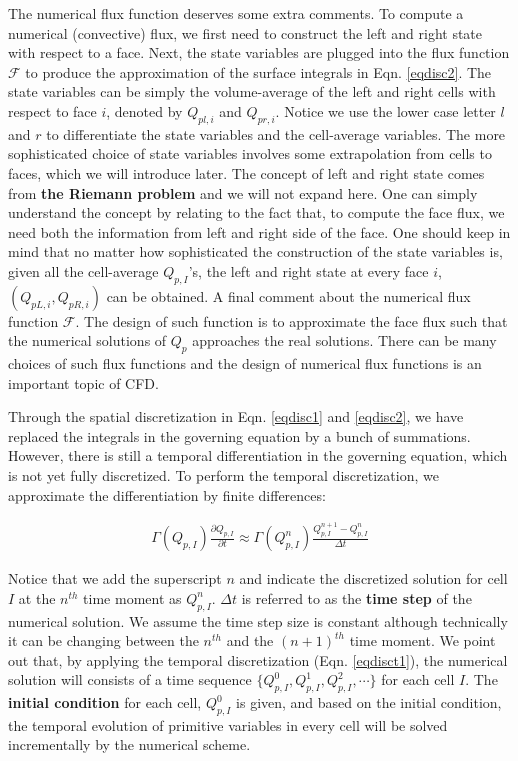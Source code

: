 \documentclass[12pt, letterpaper]{report}
\begin{document}
The numerical flux function deserves some extra comments. To compute a numerical (convective) flux,
we first need to construct the left and right state with respect to a face. Next, the state
variables are plugged into the flux function $\mathcal{F}$ to produce the approximation of the
surface integrals in Eqn.  \ref{eqdisc2}.  The state variables can be simply the volume-average of
the left and right cells with respect to face $i$, denoted by $Q_{pl,i}$ and $Q_{pr,i}$. Notice we
use the lower case letter $l$ and $r$ to differentiate the state variables and the cell-average
variables. The more sophisticated choice of state variables involves some extrapolation from cells
to faces, which we will introduce later. The concept of left and right state comes from {\bf the
Riemann problem} \cite{toro2013riemann} and we will not expand here.  One can simply understand the
concept by relating to the fact that, to compute the face flux, we need both the information from
left and right side of the face. One should keep in mind that no matter how sophisticated the
construction of the state variables is, given all the cell-average $Q_{p,I}$'s, the left and right
state at every face $i$, $(Q_{pL,i}, Q_{pR,i})$ can be obtained. A final comment about the numerical
flux function $\mathcal{F}$. The design of such function is to approximate the face flux such that
the numerical solutions of $Q_p$ approaches the real solutions.  There can be many choices of such
flux functions and the design of numerical flux functions is an important topic of CFD. \paraspace

Through the spatial discretization in Eqn. \ref{eqdisc1} and \ref{eqdisc2}, we have replaced the
integrals in the governing equation by a bunch of summations. However, there is still a temporal
differentiation in the governing equation, which is not yet fully discretized. To perform the
temporal discretization, we approximate the differentiation by finite differences:

\begin{align}\label{eqdisct1}
   \Gamma(Q_{p,I})\frac{\partial Q_{p,I}}{\partial t} \approx \Gamma(Q_{p,I}^n) \frac{Q_{p,I}^{n+1} -
   Q_{p,I}^n}{\Delta t}
\end{align}

Notice that we add the superscript $n$ and indicate the discretized solution for cell $I$ at the
$n^{th}$ time moment as $Q_{p,I}^n$. $\Delta t$ is referred to as the {\bf time step} of the
numerical solution. We assume the time step size is constant although technically it can be changing
between the $n^{th}$ and the $(n+1)^{th}$ time moment. We point out that, by applying the temporal
discretization (Eqn. \ref{eqdisct1}), the numerical solution will consists of a time sequence
$\{Q_{p,I}^0, Q_{p,I}^1, Q_{p,I}^2, \cdots\}$ for each cell $I$. The {\bf initial condition} for
each cell, $Q_{p,I}^0$ is given, and based on the initial condition, the temporal evolution of
primitive variables in every cell will be solved incrementally by the numerical scheme.  \paraspace
\end{document}
